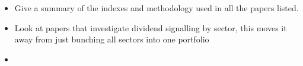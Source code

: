 \documentclass[
]{article}
\providecommand{\tightlist}{%
  \setlength{\itemsep}{0pt}\setlength{\parskip}{0pt}}
\begin{document}
\begin{itemize}
\tightlist
\item
  Give a summary of the indexes and methodology used in all the papers
  listed.
\item
  Look at papers that investigate dividend signalling by sector, this
  moves it away from just bunching all sectors into one portfolio
\item
\end{itemize}
\end{document}

